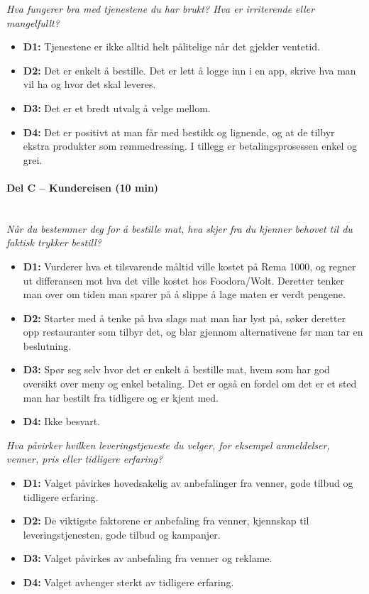 \textit{Hva fungerer bra med tjenestene du har brukt? Hva er irriterende
eller mangelfullt?}
\begin{itemize}[leftmargin=1.5em, nosep]
  \item \textbf{D1:} Tjenestene er ikke alltid helt pålitelige når det
  gjelder ventetid.
  \item \textbf{D2:} Det er enkelt å bestille. Det er lett å logge inn i en
  app, skrive hva man vil ha og hvor det skal leveres.
  \item \textbf{D3:} Det er et bredt utvalg å velge mellom.
  \item \textbf{D4:} Det er positivt at man får med bestikk og lignende, og
  at de tilbyr ekstra produkter som rømmedressing. I tillegg er
  betalingsprosessen enkel og grei.
\end{itemize}

\paragraph{Del C -- Kundereisen (10 min)}\mbox{}\\
\textit{Når du bestemmer deg for å bestille mat, hva skjer fra du kjenner
behovet til du faktisk trykker bestill?}
\begin{itemize}[leftmargin=1.5em, nosep]
  \item \textbf{D1:} Vurderer hva et tilsvarende måltid ville kostet
  på Rema 1000, og regner ut differansen mot hva det ville kostet hos
  Foodora/Wolt. Deretter tenker man over om tiden man sparer på å slippe
  å lage maten er verdt pengene.
  \item \textbf{D2:} Starter med å tenke på hva slags mat man har lyst på,
  søker deretter opp restauranter som tilbyr det, og blar gjennom
  alternativene før man tar en beslutning.
  \item \textbf{D3:} Spør seg selv hvor det er enkelt å bestille mat, hvem
  som har god oversikt over meny og enkel betaling. Det er også en fordel om
  det er et sted man har bestilt fra tidligere og er kjent med.
  \item \textbf{D4:} Ikke besvart.
\end{itemize}

\textit{Hva påvirker hvilken leveringstjeneste du velger, for eksempel
anmeldelser, venner, pris eller tidligere erfaring?}
\begin{itemize}[leftmargin=1.5em, nosep]
  \item \textbf{D1:} Valget påvirkes hovedsakelig av anbefalinger fra venner,
  gode tilbud og tidligere erfaring.
  \item \textbf{D2:} De viktigste faktorene er anbefaling fra venner,
  kjennskap til leveringstjenesten, gode tilbud og kampanjer.
  \item \textbf{D3:} Valget påvirkes av anbefaling fra venner og reklame.
  \item \textbf{D4:} Valget avhenger sterkt av tidligere erfaring.
\end{itemize}

